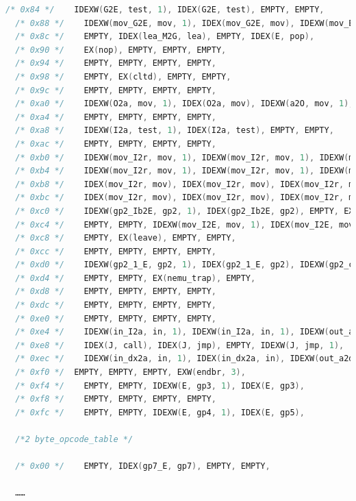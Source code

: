 \documentclass[UTF8,a4paper,10pt]{ctexart}
\begin{document}
\begin{itemize}
\begin{lstlisting}[language = C]
  /* 0x84 */	IDEXW(G2E, test, 1), IDEX(G2E, test), EMPTY, EMPTY,
  /* 0x88 */	IDEXW(mov_G2E, mov, 1), IDEX(mov_G2E, mov), IDEXW(mov_E2G, mov, 1), IDEX(mov_E2G, mov),
  /* 0x8c */	EMPTY, IDEX(lea_M2G, lea), EMPTY, IDEX(E, pop),
  /* 0x90 */	EX(nop), EMPTY, EMPTY, EMPTY,
  /* 0x94 */	EMPTY, EMPTY, EMPTY, EMPTY,
  /* 0x98 */	EMPTY, EX(cltd), EMPTY, EMPTY,
  /* 0x9c */	EMPTY, EMPTY, EMPTY, EMPTY,
  /* 0xa0 */	IDEXW(O2a, mov, 1), IDEX(O2a, mov), IDEXW(a2O, mov, 1), IDEX(a2O, mov),
  /* 0xa4 */	EMPTY, EMPTY, EMPTY, EMPTY,
  /* 0xa8 */	IDEXW(I2a, test, 1), IDEX(I2a, test), EMPTY, EMPTY,
  /* 0xac */	EMPTY, EMPTY, EMPTY, EMPTY,
  /* 0xb0 */	IDEXW(mov_I2r, mov, 1), IDEXW(mov_I2r, mov, 1), IDEXW(mov_I2r, mov, 1), IDEXW(mov_I2r, mov, 1),
  /* 0xb4 */	IDEXW(mov_I2r, mov, 1), IDEXW(mov_I2r, mov, 1), IDEXW(mov_I2r, mov, 1), IDEXW(mov_I2r, mov, 1),
  /* 0xb8 */	IDEX(mov_I2r, mov), IDEX(mov_I2r, mov), IDEX(mov_I2r, mov), IDEX(mov_I2r, mov),
  /* 0xbc */	IDEX(mov_I2r, mov), IDEX(mov_I2r, mov), IDEX(mov_I2r, mov), IDEX(mov_I2r, mov),
  /* 0xc0 */	IDEXW(gp2_Ib2E, gp2, 1), IDEX(gp2_Ib2E, gp2), EMPTY, EX(ret),
  /* 0xc4 */	EMPTY, EMPTY, IDEXW(mov_I2E, mov, 1), IDEX(mov_I2E, mov),
  /* 0xc8 */	EMPTY, EX(leave), EMPTY, EMPTY,
  /* 0xcc */	EMPTY, EMPTY, EMPTY, EMPTY,
  /* 0xd0 */	IDEXW(gp2_1_E, gp2, 1), IDEX(gp2_1_E, gp2), IDEXW(gp2_cl2E, gp2, 1), IDEX(gp2_cl2E, gp2),
  /* 0xd4 */	EMPTY, EMPTY, EX(nemu_trap), EMPTY,
  /* 0xd8 */	EMPTY, EMPTY, EMPTY, EMPTY,
  /* 0xdc */	EMPTY, EMPTY, EMPTY, EMPTY,
  /* 0xe0 */	EMPTY, EMPTY, EMPTY, EMPTY,
  /* 0xe4 */	IDEXW(in_I2a, in, 1), IDEXW(in_I2a, in, 1), IDEXW(out_a2I, out, 1), IDEXW(out_a2I, out, 1),
  /* 0xe8 */	IDEX(J, call), IDEX(J, jmp), EMPTY, IDEXW(J, jmp, 1),
  /* 0xec */	IDEXW(in_dx2a, in, 1), IDEX(in_dx2a, in), IDEXW(out_a2dx, out, 1), IDEX(out_a2dx, out),
  /* 0xf0 */  EMPTY, EMPTY, EMPTY, EXW(endbr, 3),
  /* 0xf4 */	EMPTY, EMPTY, IDEXW(E, gp3, 1), IDEX(E, gp3),
  /* 0xf8 */	EMPTY, EMPTY, EMPTY, EMPTY,
  /* 0xfc */	EMPTY, EMPTY, IDEXW(E, gp4, 1), IDEX(E, gp5),

  /*2 byte_opcode_table */

  /* 0x00 */	EMPTY, IDEX(gp7_E, gp7), EMPTY, EMPTY,

  ……


\end{lstlisting}
\end{itemize}
\end{document}
